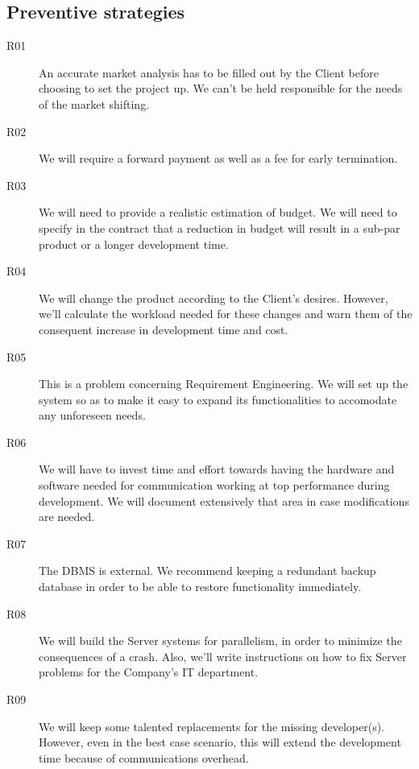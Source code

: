 \subsection{Preventive strategies}
\begin{description}
	\item[R01] An accurate market analysis has to be filled out by the Client before choosing to set the project up. We can't be held responsible for the needs of the market shifting.
	\item[R02] We will require a forward payment as well as a fee for early termination.
	\item[R03] We will need to provide a realistic estimation of budget. We will need to specify in the contract that a reduction in budget will result in a sub-par product or a longer development time.
	\item[R04] We will change the product according to the Client's desires. However, we'll calculate the workload needed for these changes and warn them of the consequent increase in development time and cost.
	\item[R05] This is a problem concerning Requirement Engineering. We will set up the system so as to make it easy to expand its functionalities to accomodate any unforeseen needs.
	\item[R06] We will have to invest time and effort towards having the hardware and software needed for communication working at top performance during development. We will document extensively that area in case modifications are needed.
	\item[R07] The DBMS is external. We recommend keeping a redundant backup database in order to be able to restore functionality immediately.
	\item[R08] We will build the Server systems for parallelism, in order to minimize the consequences of a crash. Also, we'll write instructions on how to fix Server problems for the Company's IT department.
	\item[R09] We will keep some talented replacements for the missing developer(s). However, even in the best case scenario, this will extend the development time because of communications overhead.
\end{description}